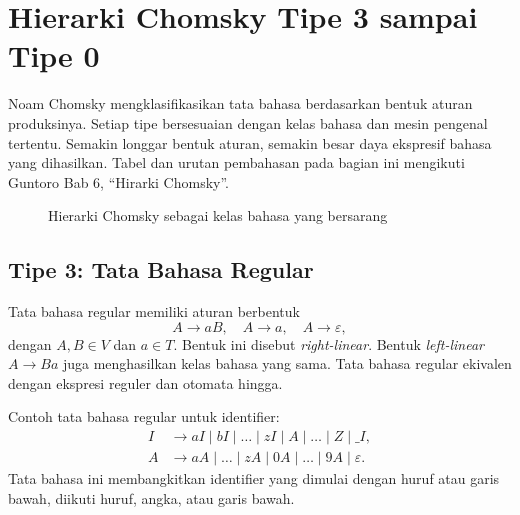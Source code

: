 \section{Hierarki Chomsky Tipe 3 sampai Tipe 0}
\label{sec:ch04-hierarki}

Noam Chomsky mengklasifikasikan tata bahasa berdasarkan bentuk aturan
produksinya. Setiap tipe bersesuaian dengan kelas bahasa dan mesin
pengenal tertentu. Semakin longgar bentuk aturan, semakin besar daya
ekspresif bahasa yang dihasilkan. Tabel dan urutan pembahasan pada
bagian ini mengikuti Guntoro Bab 6, ``Hirarki Chomsky''.

\begin{figure}[H]
\centering
{}
\caption{Hierarki Chomsky sebagai kelas bahasa yang bersarang}
\label{fig:ch04-hierarki}
\end{figure}

\subsection{Tipe 3: Tata Bahasa Regular}

Tata bahasa regular memiliki aturan berbentuk
\[
A \to aB, \quad A \to a, \quad A \to \varepsilon,
\]
dengan \(A, B \in V\) dan \(a \in T\). Bentuk ini disebut
\emph{right-linear}. Bentuk \emph{left-linear} \(A \to Ba\) juga
menghasilkan kelas bahasa yang sama. Tata bahasa regular ekivalen
dengan ekspresi reguler dan otomata hingga.

Contoh tata bahasa regular untuk identifier:
\[
\begin{aligned}
I &\to aI \mid bI \mid \ldots \mid zI \mid A \mid \ldots \mid Z
      \mid \_I,\\
A &\to aA \mid \ldots \mid zA \mid 0A \mid \ldots \mid 9A
      \mid \varepsilon.
\end{aligned}
\]
Tata bahasa ini membangkitkan identifier yang dimulai dengan huruf
atau garis bawah, diikuti huruf, angka, atau garis bawah.

